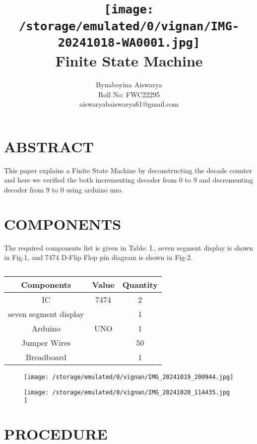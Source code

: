 \documentclass[conference]{IEEEtran}
\title{
\vspace{1cm}
{\texttt{[image:            /storage/emulated/0/vignan/IMG-20241018-WA0001.jpg]} \\ Finite State Machine} }
\author{Bynaboyina Aiswarya \\ Roll No: FWC22295 \\ aiswaryabaiswarya61@gmail.com}
\begin{document}
\maketitle
 \section {ABSTRACT}
 This paper explains a Finite State Machine by deconstructing the decade counter and here we verified the both incrementing decoder from $0$ to $9$ and decrementing decoder from $9$ to $0$ using arduino uno.

\section{COMPONENTS}
The required components list is given in Table: I., seven segment display is shown in Fig.1, and 7474 D-Flip Flop pin diagram is shown in Fig-2.
\vspace{0.3cm}
 \begin{table} [htbp]
\centering
\begin{tabular}{| c | c | c |} \hline
Components & Value & Quantity \\\hline
IC & 7474 & 2 \\ \hline
seven segment display & & 1\\ \hline
Arduino & UNO & 1 \\ \hline
Jumper Wires &  & 50 \\ \hline
Breadboard & & 1 \\ 
\hline
\end{tabular}
\vspace{0.3cm}
\caption{\label{tab:widgets}}
\end{table}

\begin{figure}[h]                           
\centering                                 
\texttt{[image:  /storage/emulated/0/vignan/IMG\_20241019\_200944.jpg]}                                           
\caption{\label{fig-1:Gates}}               
\end{figure}

\begin{figure}[h]                           
\centering                                 
\texttt{[image:   /storage/emulated/0/vignan/IMG\_20241020\_114435.jpg  ]}                                           
\caption{\label{fig-2:Gates}}               
\end{figure}

\section{PROCEDURE}
\end{document}
